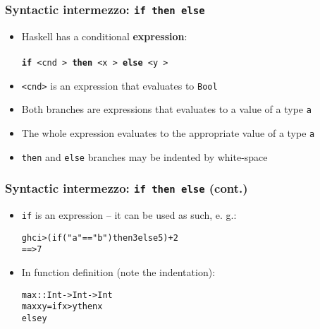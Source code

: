 \documentclass[final,handout]{beamer}
\begin{document}
\begin{frame}[fragile]
    \frametitle{Syntactic intermezzo: \texttt{if then else}}

    \begin{itemize}
        \item Haskell has a conditional \textbf{expression}:\\
            ~\\
            \texttt{{\bf if} <cnd > 
                {\bf then} <x \onslide<3->{:: a}> 
                {\bf else} <y >
                ~~~~~~~~~~~~}
        \item<2-> \texttt{<cnd>} is an expression that evaluates to \texttt{Bool}
        \item<3-> Both branches are expressions that evaluates to a value 
            of a type \texttt{a}
        \item<4-> The whole expression evaluates to the appropriate value
            of a type \texttt{a}
        \item<5-> \texttt{then} and \texttt{else} branches may be indented by
            white-space
    \end{itemize}
\end{frame}

\begin{frame}[fragile]
    \frametitle{Syntactic intermezzo: \texttt{if then else} (cont.)}

    \begin{itemize}
        \item \texttt{if} is an expression -- it can be used as such, e. g.:

    \begin{alltt}
ghci> (if ("a" == "b") then 3 else 5) + 2
    ==> 7
    \end{alltt}

\item<2->In function definition (note the indentation):

    \begin{alltt}
    max :: Int -> Int -> Int
    max x y = if x > y  then x
                        else y
    \end{alltt}
    \end{itemize}
\end{frame}



%
%            
            
\end{document}
